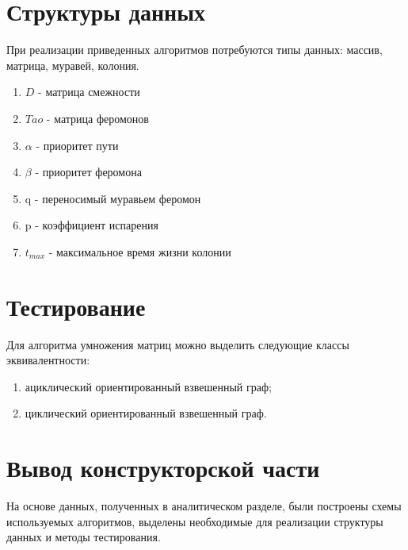 

\section{Структуры данных}\label{Structs}

При реализации приведенных алгоритмов потребуются типы данных: массив, матрица, муравей, колония.

\begin{enumerate}
  \item $D$ - матрица смежности
  \item $ Tao $ - матрица феромонов
  \item $\alpha$ - приоритет пути
  \item $\beta$ - приоритет феромона
  \item q - переносимый муравьем феромон
  \item p - коэффициент испарения 
  \item $t_{max}$ - максимальное время жизни колонии
\end{enumerate}

\section{Тестирование}\label{Testing}


Для алгоритма умножения матриц можно выделить следующие классы эквивалентности:

\begin{enumerate}
    \item ациклический ориентированный взвешенный граф;
    \item циклический ориентированный взвешенный граф.
\end{enumerate}




\section{Вывод конструкторской части}\label{KonstructResult}
На основе данных, полученных в аналитическом разделе, были построены схемы используемых алгоритмов,
выделены необходимые для реализации структуры данных и методы тестирования.

